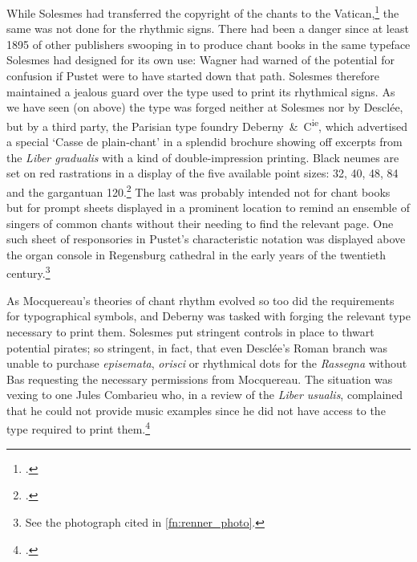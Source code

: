 While Solesmes had transferred the copyright of the chants to the Vatican,\footcite[206]{MuirRomanCatholicChurch2008} the same was not done for the rhythmic signs.
There had been a danger since at least 1895 of other publishers swooping in to produce chant books in the same typeface Solesmes had designed for its own use: Wagner had warned of the potential for confusion if Pustet were to have started down that path.
\label{sc:deberny}%
Solesmes therefore maintained a jealous guard over the type used to print its rhythmical signs.
As we have seen (on  above) the type was forged neither at Solesmes nor by Desclée, but by a third party, the Parisian type foundry Deberny~\&{}~C\textsuperscript{ie}, which advertised a special `Casse de plain-chant' in a splendid brochure showing off excerpts from the \emph{Liber gradualis} with a kind of double-impression printing.
Black neumes are set on red rastrations in a display of the five available point sizes: \linebreak{}32, 40, 48, 84 and the gargantuan 120.\footcite[part iv, pp.~210--14]{DebernyCielivrettypographiquespecimen}
The last was probably intended not for chant books but for prompt sheets displayed in a prominent location to remind an ensemble of singers of common chants without their needing to find the relevant page.
One such sheet of responsories in Pustet's characteristic notation was displayed above the organ console in Regensburg cathedral in the early years of the twentieth century.\footnote{See the photograph cited in \cref{fn:renner_photo}.}

%
As Mocquereau's theories of chant rhythm evolved so too did the requirements for typographical symbols, and Deberny was tasked with forging the relevant type necessary to print them.
Solesmes put stringent controls in place to thwart potential pirates; so stringent, in fact, that even Desclée's Roman branch was unable to purchase \emph{episemata}, \emph{orisci} or rhythmical dots for the \emph{Rassegna} without Bas requesting the necessary permissions from Mocquereau.
The situation was vexing to one Jules Combarieu who, in a review of the \emph{Liber usualis}, complained that he could not provide music examples since he did not have access to the type required to print them.\footcite[93--4]{EllisPoliticsPlainchantfindesiecle2013}
\nowidow[2]

